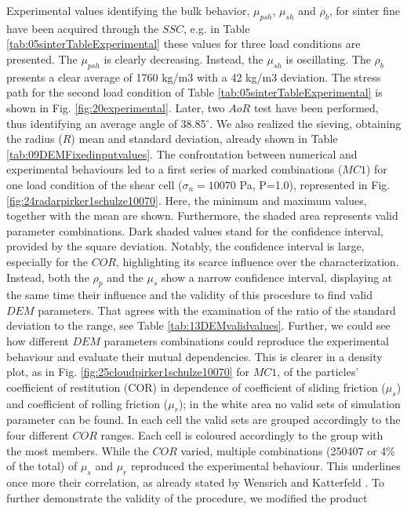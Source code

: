 \documentclass[review]{elsarticle}
\begin{document}
Experimental values identifying the bulk behavior, $\mu_{psh}$, $\mu_{sh}$ and $\rho_{b}$, 
for sinter fine have been acquired through the $SSC$, e.g. in Table
\ref{tab:05sinterTableExperimental}
these values for three load conditions are presented.
The $\mu_{psh}$ is clearly decreasing. 
Instead, the $\mu_{sh}$ is oscillating.
The $\rho_b$ presents a clear average of 1760 kg/m3 with a 42 
kg/m3 deviation.
The stress path for the second load condition of Table
\ref{tab:05sinterTableExperimental} is shown in Fig.
\ref{fig:20experimental}.
Later, two $AoR$ test have been performed, thus identifying an average angle of
38.85$^\circ$.
We also realized the sieving, obtaining the radius ($R$) mean and standard
deviation, already shown in Table \ref{tab:09DEMFixedinputvalues}.
The confrontation between numerical and experimental behaviours led to a first
series of marked combinations ($MC1$) for one load condition of
the shear cell ($\sigma_n=10070$ Pa, P=1.0), represented in Fig.
\ref{fig:24radarpirker1schulze10070}.
Here, the minimum and maximum values, together with the mean are shown. 
Furthermore, the shaded area represents valid parameter combinations.
Dark shaded values stand for the confidence interval, provided by the square
deviation.
Notably, the confidence interval is large, 
especially for the $COR$, highlighting its scarce influence over the characterization. 
Instead, both the $\rho_p$  and the $\mu_s$ show a narrow confidence interval, 
displaying at the same time their influence and the validity of this procedure to find valid $DEM$ parameters. 
That agrees with the examination of the ratio of the standard deviation to the
range, see Table \ref{tab:13DEMvalidvalues}.
Further, we could see how different $DEM$ parameters
combinations could reproduce the experimental behaviour and evaluate their mutual dependencies. 
This is clearer in a density plot, as in Fig. 
\ref{fig:25cloudpirker1schulze10070} for $MC1$, 
of the particles' coefficient of restitution (COR) in dependence
of coefficient of sliding friction ($\mu_s$) and coefficient of rolling friction ($\mu_r$); in the
white area no valid sets of simulation parameter can be found.
In each cell the valid sets are grouped accordingly to the four different $COR$
ranges.
Each cell is coloured accordingly to the group with the most members. 
While the $COR$ varied, multiple
combinations (250407 or 4\% of the total) of $\mu_s$ and $\mu_r$ reproduced
the experimental behaviour.
This underlines once more their correlation, as already stated by Wensrich and 
Katterfeld \cite{RefWorks:87}.
To further demonstrate the validity of the procedure, we modified the product
\end{document}
